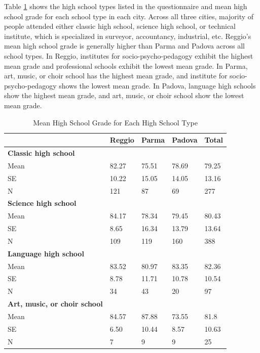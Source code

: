 Table \ref{tab:hsgrade} shows the high school types listed in the questionnaire and mean high school grade for each school type in each city. Across all three cities, majority of people attended either classic high school, science high school, or technical institute, which is specialized in surveyor, accountancy, industrial, etc. Reggio's mean high school grade is generally higher than Parma and Padova across all school types. In Reggio, institutes for socio-psycho-pedagogy exhibit the highest mean grade and professional schools exhibit the lowest mean grade. In Parma, art, music, or choir school has the highest mean grade, and institute for socio-psycho-pedagogy shows the lowest mean grade. In Padova, language high schools show the highest mean grade, and art, music, or choir school show the lowest mean grade.


\begin{table}[H]
\caption{Mean High School Grade for Each High School Type} \label{tab:hsgrade}
\begin{center}
\footnotesize
\begin{tabular}{lllll}
\toprule
  & \textbf{Reggio} & \textbf{Parma} & \textbf{Padova}  & \textbf{Total} \\ \midrule
\textbf{Classic high school}  \\
\quad Mean  & 82.27 &  75.51 &  78.69 & 79.25 \\ 
         \quad SE & 10.22 & 15.05 & 14.05 & 13.16 \\
         \quad N  &  121   &      87    &     69 &       277 \\

\textbf{Science high school} \\ 
 \quad Mean & 84.17 &  78.34 &      79.45 & 80.43 \\
  \quad SE & 8.65 & 16.34 & 13.79 & 13.64 \\
   \quad N  &       109   &     119    &    160   &      388 \\ 

\textbf{Language high school}  \\ 
 \quad Mean & 83.52  &  80.97   &   83.35  & 82.36 \\
 \quad SE & 8.78 & 11.71  & 10.78 & 10.54 \\
  \quad N &    34     &    43    &     20   &        97 \\ 

\textbf{Art, music, or choir school}  \\ 
 \quad Mean & 84.57 &  87.88 &  73.55 &      81.8 \\
  \quad SE & 6.50 &  10.44 &   8.57 & 10.63 \\
  \quad N &   7     &     9    &      9 &        25 \\ 


\end{tabular}
\end{center}
\end{table}
